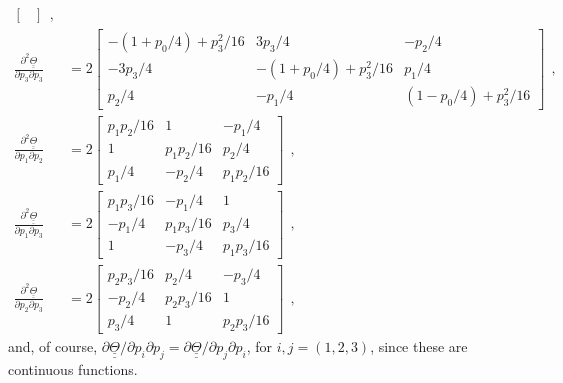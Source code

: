 \documentclass[12pt,a4paper,oneside,english]{abntex2} %
\def\tens#1{\underline{\underline{#1}}}
\def\lp{\left(}
\def\rp{\right)}
\def\Th{\tens{\Theta}}
\begin{document}
\begin{apendicesenv}
\begin{align}
\begin{bmatrix}
    \end{bmatrix} \ \ ,
    \label{eq:dT_dp2dp2}
    \\
    \frac{\partial^2\Th}{\partial p_3\partial p_3} &= 
    2\begin{bmatrix}
    -\lp1+p_0/4\rp+p_3^2/16 & 3p_3/4 & -p_2/4
    \\ 
    -3p_3/4 & -\lp1+p_0/4\rp+p_3^2/16 & p_1/4
    \\ 
    p_2/4 & -p_1/4 & \lp1-p_0/4\rp+p_3^2/16
    \end{bmatrix} \ \ ,
    \label{eq:dT_dp3dp3}
    \\
    \frac{\partial^2\Th}{\partial p_1\partial p_2} &= 
    2\begin{bmatrix}
    p_1p_2/16 & 1 & -p_1/4
    \\ 
    1 & p_1p_2/16 & p_2/4
    \\ 
    p_1/4 & -p_2/4 & p_1p_2/16
    \end{bmatrix} \ \ ,
    \label{eq:dT_dp1dp2}
    \\
    \frac{\partial^2\Th}{\partial p_1\partial p_3} &= 
    2\begin{bmatrix}
    p_1p_3/16 & -p_1/4 & 1
    \\ 
    -p_1/4 & p_1p_3/16 & p_3/4
    \\ 
    1 & -p_3/4 & p_1p_3/16
    \end{bmatrix} \ \ ,
    \label{eq:dT_dp1dp3}
    \\
    \frac{\partial^2\Th}{\partial p_2\partial p_3} &= 
    2\begin{bmatrix}
    p_2p_3/16 & p_2/4 & -p_3/4
    \\ 
    -p_2/4 & p_2p_3/16 & 1
    \\ 
    p_3/4 & 1 & p_2p_3/16
    \end{bmatrix} \ \ ,
    \label{eq:dT_dp2dp3}
\end{align}
and, of course, $\partial\Th/\partial p_i\partial p_j = \partial\Th/\partial p_j\partial p_i$, for $i,j = (1,2,3)$, since these are continuous functions.


\end{apendicesenv}
\end{document}
